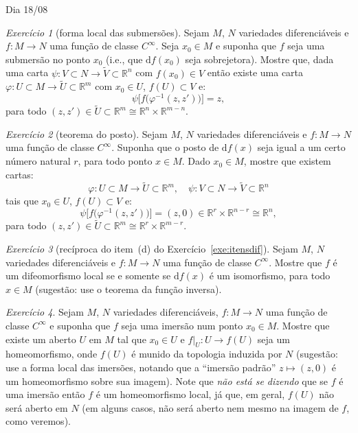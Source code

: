 \documentclass[oneside,11pt]{amsart}
\newcommand{\R}{\mathds R}
\newcommand{\dd}{\mathrm d}
\theoremstyle{remark}\newtheorem{exercise}{Exercício}[section]
\theoremstyle{plain}\newtheorem{teo}{Teorema}[section]
\theoremstyle{plain}\newtheorem{lem}[teo]{Lema}
\theoremstyle{plain}\newtheorem{prop}[teo]{Proposição}
\theoremstyle{definition}\newtheorem{defin}[teo]{Definição}
\theoremstyle{remark}\newtheorem{rem}[teo]{Observação}
\theoremstyle{definition}\newtheorem{example}[teo]{Exemplo}
\numberwithin{equation}{section}
\begin{document}
\begin{section}{Dia 18/08}
\begin{exercise}[forma local das submersões]
Sejam $M$, $N$ variedades diferenciáveis e $f:M\to N$ uma função de classe $C^\infty$. Seja $x_0\in M$ e suponha
que $f$ seja uma submersão no ponto $x_0$ (i.e., que $\dd f(x_0)$ seja sobrejetora). Mostre que, dada uma carta
$\psi:V\subset N\to\widetilde V\subset\R^n$ com $f(x_0)\in V$ então existe uma carta $\varphi:U\subset M\to\widetilde U\subset\R^m$
com $x_0\in U$, $f(U)\subset V$ e:
\[\psi\big[f\big(\varphi^{-1}(z,z')\big)\big]=z,\]
para todo $(z,z')\in\widetilde U\subset\R^m\cong\R^n\times\R^{m-n}$.
\end{exercise}

\begin{exercise}[teorema do posto]\label{exe:posto}
Sejam $M$, $N$ variedades diferenciáveis e $f:M\to N$ uma função de classe $C^\infty$. Suponha que o posto
de $\dd f(x)$ seja igual a um certo número natural $r$, para todo ponto $x\in M$. Dado $x_0\in M$, mostre que existem
cartas:
\[\varphi:U\subset M\longrightarrow\widetilde U\subset\R^m,\quad
\psi:V\subset N\longrightarrow\widetilde V\subset\R^n\]
tais que $x_0\in U$, $f(U)\subset V$ e:
\[\psi\big[f\big(\varphi^{-1}(z,z')\big)\big]=(z,0)\in\R^r\times\R^{n-r}\cong\R^n,\]
para todo $(z,z')\in\widetilde U\subset\R^m\cong\R^r\times\R^{m-r}$.
\end{exercise}

\begin{exercise}[recíproca do item~(d) do Exercício~\ref{exe:itensdif}]
Sejam $M$, $N$ variedades diferenciáveis e $f:M\to N$ uma função de classe $C^\infty$. Mostre que $f$ é um difeomorfismo
local se e somente se $\dd f(x)$ é um isomorfismo, para todo $x\in M$ (sugestão: use o teorema da função inversa).
\end{exercise}

\begin{exercise}\label{exe:imerlochomeo}
Sejam $M$, $N$ variedades diferenciáveis, $f:M\to N$ uma função de classe $C^\infty$ e suponha que $f$ seja uma imersão
num ponto $x_0\in M$. Mostre que existe um aberto $U$ em $M$ tal que $x_0\in U$ e $f\vert_U:U\to f(U)$ seja um homeomorfismo,
onde $f(U)$ é munido da topologia induzida por $N$ (sugestão: use a forma local das imersões, notando que a ``imersão padrão''
$z\mapsto(z,0)$ é um homeomorfismo sobre sua imagem). Note que {\em não está se dizendo\/} que se $f$ é uma imersão
então $f$ é um homeomorfismo local,
já que, em geral, $f(U)$ não será aberto em $N$ (em alguns casos, não será aberto nem mesmo na imagem de $f$, como veremos).
\end{exercise}


\end{section}
\end{document}

